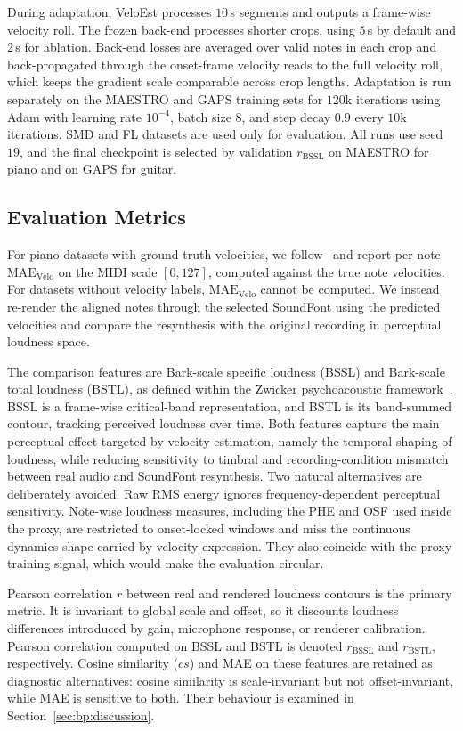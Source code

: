 During adaptation, VeloEst processes $10$\,s segments and outputs a frame-wise velocity roll. The frozen back-end processes shorter crops, using $5$\,s by default and $2$\,s for ablation. Back-end losses are averaged over valid notes in each crop and back-propagated through the onset-frame velocity reads to the full velocity roll, which keeps the gradient scale comparable across crop lengths. Adaptation is run separately on the MAESTRO and GAPS training sets for $120$k iterations using Adam with learning rate $10^{-4}$, batch size $8$, and step decay $0.9$ every $10$k iterations. SMD and FL datasets are used only for evaluation. All runs use seed $19$, and the final checkpoint is selected by validation $r_{\mathrm{BSSL}}$ on MAESTRO for piano and on GAPS for guitar.

\subsection{Evaluation Metrics}
\label{ssec:bp:metrics}

For piano datasets with ground-truth velocities, we follow~\cite{kim2024method} and report per-note $\mathrm{MAE}_{\mathrm{Velo}}$ on the MIDI scale $[0, 127]$, computed against the true note velocities. For datasets without velocity labels, $\mathrm{MAE}_{\mathrm{Velo}}$ cannot be computed. We instead re-render the aligned notes through the selected SoundFont using the predicted velocities and compare the resynthesis with the original recording in perceptual loudness space.

The comparison features are Bark-scale specific loudness (BSSL) and Bark-scale total loudness (BSTL), as defined within the Zwicker psychoacoustic framework~\cite{zwicker1999psychoacoustics}. BSSL is a frame-wise critical-band representation, and BSTL is its band-summed contour, tracking perceived loudness over time. Both features capture the main perceptual effect targeted by velocity estimation, namely the temporal shaping of loudness, while reducing sensitivity to timbral and recording-condition mismatch between real audio and SoundFont resynthesis. Two natural alternatives are deliberately avoided. Raw RMS energy ignores frequency-dependent perceptual sensitivity. Note-wise loudness measures, including the PHE and OSF used inside the proxy, are restricted to onset-locked windows and miss the continuous dynamics shape carried by velocity expression. They also coincide with the proxy training signal, which would make the evaluation circular.

Pearson correlation $r$ between real and rendered loudness contours is the primary metric. It is invariant to global scale and offset, so it discounts loudness differences introduced by gain, microphone response, or renderer calibration. Pearson correlation computed on BSSL and BSTL is denoted $r_{\mathrm{BSSL}}$ and $r_{\mathrm{BSTL}}$, respectively. Cosine similarity ($cs$) and MAE on these features are retained as diagnostic alternatives: cosine similarity is scale-invariant but not offset-invariant, while MAE is sensitive to both. Their behaviour is examined in Section~\ref{sec:bp:discussion}.

